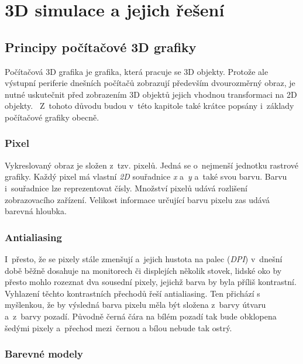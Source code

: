 \documentclass[a4paper,12pt]{article}
\begin{document}

\section{3D simulace a jejich řešení}

\subsection{Principy počítačové 3D grafiky}

Počítačová 3D grafika je grafika, která pracuje se 3D objekty. Protože ale výstupní periferie dnešních počítačů zobrazují především dvourozměrný obraz, je nutné uskutečnit před zobrazením 3D objektů jejich vhodnou transformaci na 2D objekty.~\cite{graphic} Z~tohoto důvodu budou v~této kapitole také krátce popsány i~základy počítačové grafiky obecně.

\subsubsection{Pixel}

Vykreslovaný obraz je složen z~tzv. pixelů. Jedná se o~nejmenší jednotku rastrové grafiky. Každý pixel má vlastní \textit{2D} souřadnice \textit{x} a~\textit{y} a~také svou barvu. Barvu i~souřadnice lze reprezentovat čísly. Množství pixelů udává rozlišení zobrazovacího zařízení. Velikost informace určující barvu pixelu zas udává barevná hloubka.~\cite{graphic}

\subsubsection{Antialiasing}

I~přesto, že se pixely stále zmenšují a~jejich hustota na palec (\textit{DPI}) v~dnešní době běžně dosahuje na monitorech či displejích několik stovek, lidské oko by přesto mohlo rozeznat dva sousední pixely, jejichž barva by byla příliš kontrastní. Vyhlazení těchto kontrastních přechodů řeší antialiasing. Ten přichází s myšlenkou, že by výsledná barva pixelu měla být složena z~barvy útvaru a~z~barvy pozadí. Původně černá čára na bílém pozadí tak bude obklopena šedými pixely a~přechod mezi~černou a bílou nebude tak ostrý.~\cite{graphic}

\subsubsection{Barevné modely}
\end{document}
